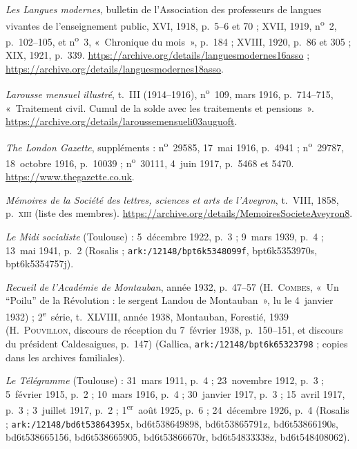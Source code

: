 \begin{biblist}
\item \textit{Les Langues modernes}, bulletin de l'Association des professeurs de langues vivantes de l'enseignement public, XVI, 1918, p.~5--6 et 70 ; XVII, 1919, n\textsuperscript{o}~2, p.~102--105, et n\textsuperscript{o}~3, «~Chronique du mois~», p.~184 ; XVIII, 1920, p.~86 et 305 ; XIX, 1921, p.~339. \url{https://archive.org/details/languesmodernes16asso} ; \url{https://archive.org/details/languesmodernes18asso}.
\item \textit{Larousse mensuel illustré}, t.~III (1914--1916), n\textsuperscript{o}~109, mars 1916, p.~714--715, «~Traitement civil. Cumul de la solde avec les traitements et pensions~». \url{https://archive.org/details/laroussemensueli03auguoft}.
\item \textit{The London Gazette}, suppléments : n\textsuperscript{o}~29585, 17~mai 1916, p.~4941 ; n\textsuperscript{o}~29787, 18~octobre 1916, p.~10039 ; n\textsuperscript{o}~30111, 4~juin 1917, p.~5468 et 5470. \url{https://www.thegazette.co.uk}.
\item \textit{Mémoires de la Société des lettres, sciences et arts de l'Aveyron}, t.~VIII, 1858, p.~\textsc{xiii} (liste des membres). \url{https://archive.org/details/MemoiresSocieteAveyron8}.
\item \textit{Le Midi socialiste} (Toulouse) : 5~décembre 1922, p.~3 ; 9~mars 1939, p.~4 ; 13~mai 1941, p.~2 (Rosalis ; \nolinkurl{ark:/12148/bpt6k5348099f}, bpt6k5353970s, bpt6k5354757j).
\item \textit{Recueil de l'Académie de Montauban}, année 1932, p.~47--57 (H.~\textsc{Combes}, «~Un “Poilu” de la Révolution : le sergent Landou de Montauban~», lu le 4~janvier 1932) ; 2\textsuperscript{e}~série, t.~XLVIII, année 1938, Montauban, Forestié, 1939 (H.~\textsc{Pouvillon}, discours de réception du 7~février 1938, p.~150--151, et discours du président Caldesaigues, p.~147) (Gallica, \nolinkurl{ark:/12148/bpt6k65323798} ; copies dans les archives familiales).
\item \textit{Le Télégramme} (Toulouse) : 31~mars 1911, p.~4 ; 23~novembre 1912, p.~3 ; 5~février 1915, p.~2 ; 10~mars 1916, p.~4 ; 30~janvier 1917, p.~3 ; 15~avril 1917, p.~3 ; 3~juillet 1917, p.~2 ; 1\textsuperscript{er}~août 1925, p.~6 ; 24~décembre 1926, p.~4 (Rosalis ; \nolinkurl{ark:/12148/bd6t53864395x}, bd6t538649898, bd6t53865791z, bd6t53866190s, bd6t538665156, bd6t538665905, bd6t53866670r, bd6t54833338z, bd6t548408062).
\end{biblist}

